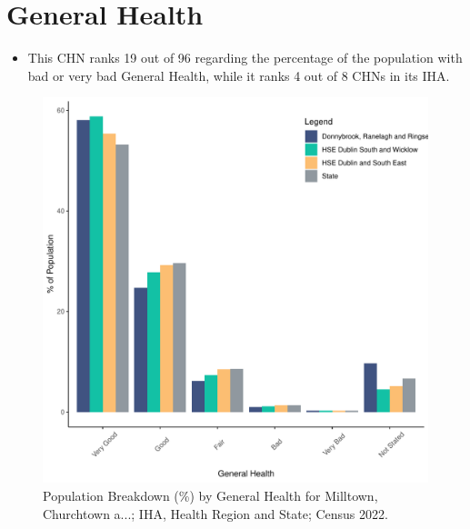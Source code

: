 \documentclass{article}
\begin{document}
\pagebreak

\section{General Health}\label{sect:GenHealth}
\begin{itemize}
\item  This CHN ranks  19 out of 96 regarding the percentage of the population with bad or very bad General Health, while it ranks   4 out of 8 CHNs in its IHA.
\end{itemize}
\begin{figure}[h]
	\centering
	\includegraphics[width = 150mm]{../figures/GenED.pdf}
	\caption{Population Breakdown (\%) by General Health for Milltown, Churchtown a...; IHA, Health Region and State;  Census 2022.}
	\label{fig:2ae19629-1a6a-13a3-e055-000000000001}
	\end{figure}
\end{document}
